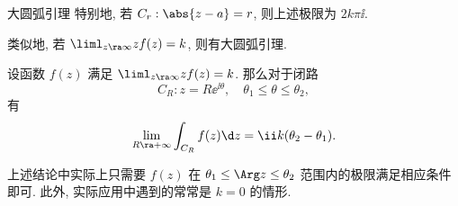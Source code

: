\begin{frame}{大圆弧引理\noexer}
	\onslide<+->
	特别地, 若 $C_r:\abs{z-a}=r$, 则上述极限为 $2k\pi \ii$.

	\onslide<+->
	类似地, 若 $\liml_{z\ra \infty} zf(z)=k$, 则有大圆弧引理.
	\begin{theorem*}[][大圆弧引理]
		设函数 $f(z)$ 满足 $\liml_{z\ra\infty}zf(z)=k$.
		那么对于闭路
		\[
			C_R: z=R\ee^{\ii \theta},\quad \theta_1\le\theta\le\theta_2,
		\]
		有
		\[
			\lim_{R\ra+\infty}\int_{C_R}f(z)\d z=\ii k(\theta_2-\theta_1).
		\]
	\end{theorem*}
	\onslide<+->
	上述结论中实际上只需要 $f(z)$ 在 $\theta_1\le \Arg z\le \theta_2$ 范围内的极限满足相应条件即可.
	\onslide<+->
	此外, 实际应用中遇到的常常是 $k=0$ 的情形.
\end{frame}
